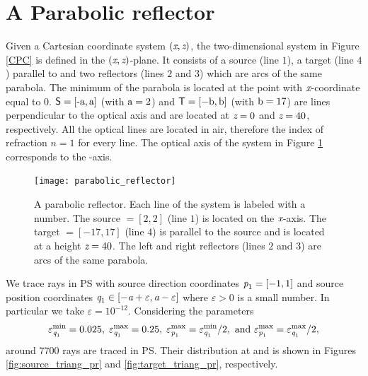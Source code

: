 \section{A Parabolic reflector}
Given a Cartesian coordinate system  $(\textit{x},\textit{z})$, the two-dimensional system in Figure \ref{CPC} is defined in the $(\textit{x},\textit{z})$-plane.
 It consists of a source  (line $1$), a target  (line $4$) parallel to  and two reflectors (lines $2$ and $3$) which are arcs of the same parabola. 
  The minimum of the parabola is located at the point with $\textit{x}$-coordinate equal to $0$. $\textsf{S}=[\textrm{-a}, \textrm{a}]$ (with $\textrm{a}=2$) and $\textsf{T}=[-\textrm{b},\textrm{b}]$ (with $\textrm{b}=17$) are lines perpendicular to the optical axis and are located at $\textit{z}=0$ and $\textit{z}=40$, respectively.
All the optical lines are located in air, therefore the index of refraction ${n}=1$ for every line.
The optical axis of the system in Figure \ref{fig:PR} corresponds to the -axis.
\begin{figure}[h!]
\centering
\texttt{[image: parabolic\_reflector]}
\caption{\textrm{A parabolic reflector.}  Each line of the system is labeled with a number.
   The source $= [2,2]$ (line $1$) is located on the $\textit{x}$-axis.
   The target $= [-17, 17]$ (line $4$) is parallel to the source and is located at a height $ \textit{z}= 40$.
   The left and right reflectors (lines $2$ and $3$) are arcs of the same parabola.}
\label{fig:PR}
\end{figure}
We trace rays in PS with source direction coordinates $\textit{p}_1 = [-1,1]$ and source position coordinates $\textit{q}_1\in[-\textit{a}+\varepsilon,\textit{a}-\varepsilon]$ where $\varepsilon>0$ is a small number. In particular we take $\varepsilon = 10^{-12}$. Considering the parameters $$\varepsilon_{\textit{q}_1}^{\textrm{min}} = 0.025, \; \varepsilon_{\textit{q}_1}^{\textrm{max}} = 0.25, \; \varepsilon_{\textit{p}_1}^{\textrm{max}} = \varepsilon_{\textit{q}_1}^{\textrm{min}}/2, \mbox{ and }  \varepsilon_{\textit{p}_1}^{\textrm{max}} = \varepsilon_{\textit{q}_1}^{\textrm{max}}/2, $$ around $7700$ rays are traced in PS. Their distribution at  and  is shown in Figures \ref{fig:source_triang_pr} and \ref{fig:target_triang_pr}, respectively. 

